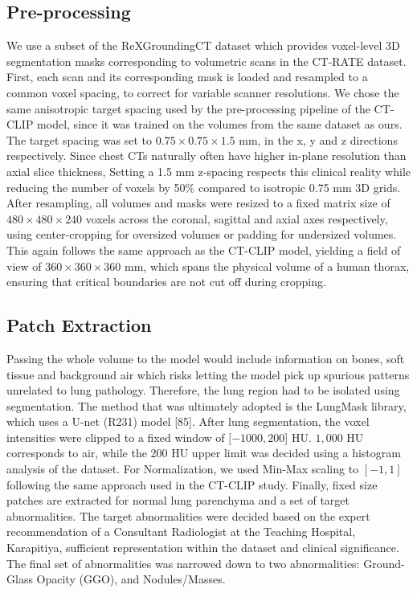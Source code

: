\documentclass[conference]{IEEEtran}
\begin{document}
\subsection{Pre-processing}
We use a subset of the ReXGroundingCT \cite{rajpurkar2024rexgroundingct} dataset which provides voxel-level 3D segmentation masks corresponding
to volumetric scans in the CT-RATE \cite{hamamci2024ctrate} dataset. First, each scan and its corresponding mask is loaded and resampled to
a common voxel spacing, to correct for variable scanner resolutions. We chose the same anisotropic target spacing
used by the pre-processing pipeline of the CT-CLIP \cite{hamamci2024ctclip} model, since it was trained on the volumes from the same
dataset as ours. The target spacing was set to $0.75 \times 0.75 \times 1.5$ mm, in the x, y and z directions respectively. Since chest
CTs naturally often have higher in-plane resolution than axial slice thickness, Setting a 1.5 mm z-spacing respects this
clinical reality while reducing the number of voxels by 50\% compared to isotropic 0.75 mm 3D grids. After resampling,
all volumes and masks were resized to a fixed matrix size of $480 \times 480 \times 240$ voxels across the coronal, sagittal and
axial axes respectively, using center-cropping for oversized volumes or padding for undersized volumes. This again
follows the same approach as the CT-CLIP model, yielding a field of view of $360 \times 360 \times 360$ mm, which spans the
physical volume of a human thorax, ensuring that critical boundaries are not cut off during cropping.

\subsection{Patch Extraction}
Passing the whole volume to the model would include information on bones, soft tissue and background air which
risks letting the model pick up spurious patterns unrelated to lung pathology. Therefore, the lung region had to be
isolated using segmentation. The method that was ultimately adopted is the LungMask library, which uses a U-net
(R231) model [85]. After lung segmentation, the voxel intensities were clipped to a fixed window of $[-1000, 200$] HU.
$1,000$ HU corresponds to air, while the 200 HU upper limit was decided using a histogram analysis of the dataset. For
Normalization, we used Min-Max scaling to $[-1, 1]$ following the same approach used in the CT-CLIP study. Finally,
fixed size patches are extracted for normal lung parenchyma and a set of target abnormalities.
The target abnormalities were decided based on the expert recommendation of a Consultant Radiologist at the
Teaching Hospital, Karapitiya, sufficient representation within the dataset and clinical significance.
The final set of abnormalities was narrowed down to two abnormalities: Ground-Glass Opacity
(GGO), and Nodules/Masses.
\end{document}
